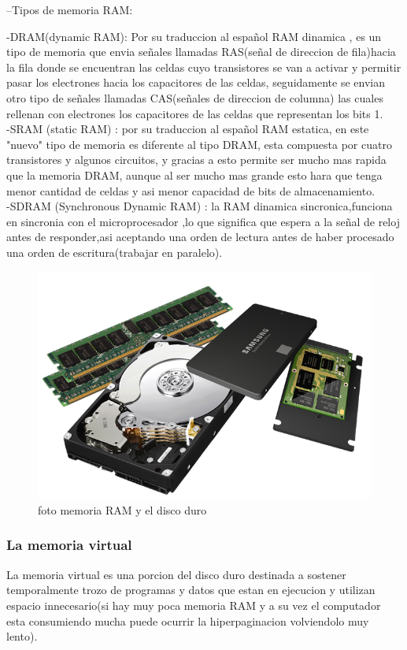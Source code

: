 \documentclass{article}
\begin{document}
        --Tipos de memoria RAM:
            
            -DRAM(dynamic RAM): Por su traduccion al español RAM dinamica , es un tipo de memoria que envia señales llamadas RAS(señal de direccion de fila)hacia la fila donde se encuentran las celdas cuyo transistores se van a activar y permitir  pasar los electrones hacia los capacitores de las celdas, seguidamente se envian otro tipo de señales llamadas CAS(señales de direccion de columna) las cuales  rellenan con electrones los capacitores de las celdas que representan los bits 1.\\
            
            -SRAM (static RAM) : por su traduccion al español RAM estatica, en este "nuevo" tipo de memoria es diferente al tipo DRAM, esta compuesta por cuatro transistores y algunos circuitos, y gracias a esto permite ser mucho mas rapida que la memoria DRAM, aunque al ser mucho mas grande esto hara que tenga menor cantidad de celdas y asi menor capacidad de bits de almacenamiento.\\
            
            -SDRAM (Synchronous Dynamic RAM) : la RAM dinamica sincronica,funciona en sincronia con el microprocesador ,lo que significa que espera a la señal de reloj antes de responder,asi aceptando una orden de lectura antes  de haber procesado una orden de escritura(trabajar en paralelo).\cite{hardzone}\\
            
            \begin{figure}[h]
            \includegraphics[width=6 cm]{imagenes/ram+hdd+ssd.png}
            \centering
            \caption{foto memoria RAM y el disco duro}
            \label{fig:ram+hdd+ssd}
            \end{figure}
            
        \subsubsection{La memoria virtual}
        La memoria virtual es una porcion del disco duro destinada a sostener temporalmente trozo de programas y datos que estan en ejecucion y utilizan espacio innecesario(si hay muy poca memoria RAM y a su vez el computador esta consumiendo mucha puede ocurrir la hiperpaginacion volviendolo muy lento).
\end{document}
